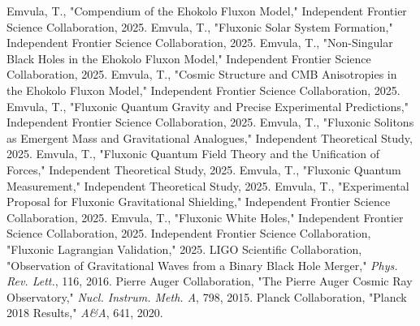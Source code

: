 \documentclass[11pt]{article}
\begin{document}



\begin{thebibliography}{9}
Emvula, T., "Compendium of the Ehokolo Fluxon Model," Independent Frontier Science Collaboration, 2025.
Emvula, T., "Fluxonic Solar System Formation," Independent Frontier Science Collaboration, 2025.
Emvula, T., "Non-Singular Black Holes in the Ehokolo Fluxon Model," Independent Frontier Science Collaboration, 2025.
Emvula, T., "Cosmic Structure and CMB Anisotropies in the Ehokolo Fluxon Model," Independent Frontier Science Collaboration, 2025.
Emvula, T., "Fluxonic Quantum Gravity and Precise Experimental Predictions," Independent Frontier Science Collaboration, 2025.
Emvula, T., "Fluxonic Solitons as Emergent Mass and Gravitational Analogues," Independent Theoretical Study, 2025.
Emvula, T., "Fluxonic Quantum Field Theory and the Unification of Forces," Independent Theoretical Study, 2025.
Emvula, T., "Fluxonic Quantum Measurement," Independent Theoretical Study, 2025.
Emvula, T., "Experimental Proposal for Fluxonic Gravitational Shielding," Independent Frontier Science Collaboration, 2025.
Emvula, T., "Fluxonic White Holes," Independent Frontier Science Collaboration, 2025.
Independent Frontier Science Collaboration, "Fluxonic Lagrangian Validation," 2025.
LIGO Scientific Collaboration, "Observation of Gravitational Waves from a Binary Black Hole Merger," \textit{Phys. Rev. Lett.}, 116, 2016.
Pierre Auger Collaboration, "The Pierre Auger Cosmic Ray Observatory," \textit{Nucl. Instrum. Meth. A}, 798, 2015.
Planck Collaboration, "Planck 2018 Results," \textit{A\&A}, 641, 2020.
\end{thebibliography}
\end{document}
